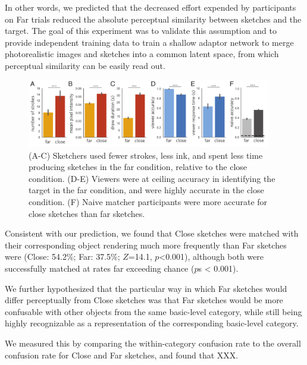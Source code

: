 \documentclass[9pt,twocolumn,twoside]{pnas-new}
\begin{document}
In other words, we predicted that the decreased effort expended by participants on Far trials reduced the absolute perceptual similarity between sketches and the target. The goal of this experiment was to validate this assumption and to provide independent training data to train a shallow adaptor network to merge photorealistic images and sketches into a common latent space, from which perceptual similarity can be easily read out.




\begin{figure}[htbp]
\centering
\includegraphics[width=0.95\textwidth]{figures/3_behavioral_performance.pdf}
\caption{(A-C) Sketchers used fewer strokes, less ink, and spent less time producing sketches in the far condition, relative to the close condition. (D-E) Viewers were at ceiling accuracy in identifying the target in the far condition, and were highly accurate in the close condition. (F) Naive matcher participants were more accurate for close sketches than far sketches.}
\label{task_performance}
\end{figure}



Consistent with our prediction, we found that Close sketches were matched with their corresponding object rendering much more frequently than Far sketches were (Close: 54.2\%; Far: 37.5\%; $Z$=14.1, $p$<0.001), although both were successfully matched at rates far exceeding chance ($p$s < 0.001).



We further hypothesized that the particular way in which Far sketches would differ perceptually from Close sketches was that Far sketches would be more confusable with other objects from the same basic-level category, while still being highly recognizable as a representation of the corresponding basic-level category.

We measured this by comparing the within-category confusion rate to the overall confusion rate for Close and Far sketches, and found that XXX.
\end{document}
